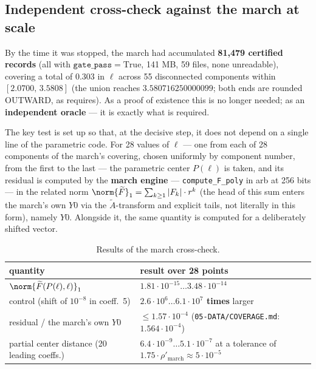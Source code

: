 \subsection{Independent cross-check against the march at scale}\label{sec:3.8}

By the time it was stopped, the march had accumulated \textbf{81,479 certified records} (all with $\texttt{gate\_pass}=\mathrm{True}$, 141 MB, 59 files, none unreadable), covering a total of 0.303 in $\ell$ across 55 disconnected components within $[2.0700,\, 3.5808]$ (the union reaches $3.580716250000099$; both ends are rounded OUTWARD, as  requires). As a proof of existence this is no longer needed; as an \textbf{independent oracle} --- it is exactly what is required.

The key test is set up so that, at the decisive step, it does not depend on a single line of the parametric code. For 28 values of $\ell$ --- one from each of 28 components of the march's covering, chosen uniformly by component number, from the first to the last --- the parametric center $P(\ell)$ is taken, and its residual is computed by the \textbf{march engine} --- \texttt{compute\_\allowbreak F\_\allowbreak poly} in arb at 256 bits --- in the related norm $\norm{\widetilde{F}}_{1} = \sum_{k\ge 1}|F_{k}|\cdot r^{k}$ (the head of this sum enters the march's own $Y0$ via the $\widetilde{A}$-transform and explicit tails, not literally in this form), namely $Y0$. Alongside it, the same quantity is computed for a deliberately shifted vector.

\begin{table}[h]
\centering
\caption{Results of the march cross-check.}\label{tab:3.8-march}
{\small\setlength{\tabcolsep}{4pt}
\begin{tabular}{l>{\raggedright\arraybackslash}p{}}
\toprule
quantity & result over 28 points \\
\midrule
$\norm{\widetilde{F}(P(\ell),\ell)}_{1}$ & $1.81\cdot 10^{-15} \ldots 3.48\cdot 10^{-14}$ \\
control (shift of $10^{-8}$ in coeff.\ 5) & \textbf{$2.6\cdot 10^{6} \ldots 6.1\cdot 10^{7}$ times} larger \\
residual / the march's own $Y0$ & $\le 1.57\cdot 10^{-4}$ (\texttt{05-\allowbreak DATA/\allowbreak COVERAGE.md}: $1.564\cdot 10^{-4}$) \\
partial center distance (20 leading coeffs.) & $6.4\cdot 10^{-9} \ldots 5.1\cdot 10^{-7}$ at a tolerance of $1.75\cdot \rho'_{\mathrm{march}} \approx 5\cdot 10^{-5}$ \\
\bottomrule
\end{tabular}}
\end{table}

